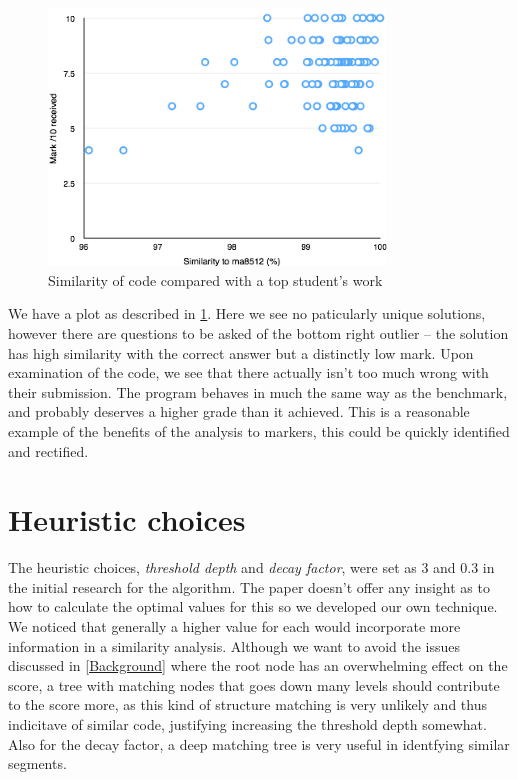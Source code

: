 \begin{figure}[h!]

	\centering
		\includegraphics[width=0.8\textwidth]{Figures/SimGraphma8512Loops}
	\caption{Similarity of code compared with a top student's work}
	\label{fig:TopMarkComparison}

\end{figure}

We have a plot as described in \cref{fig:TopMarkComparison}. Here we see no
paticularly unique solutions, however there are questions to be asked of the
bottom right outlier -- the solution has high similarity with the correct answer
but a distinctly low mark. Upon examination of the code, we see that there actually
isn't too much wrong with their submission. The program behaves in much the same
way as the benchmark, and probably deserves a higher grade than it achieved.
This is a reasonable example of the benefits of the analysis to markers, this
could be quickly identified and rectified.

\section{Heuristic choices}
The heuristic choices, \emph{threshold depth} and \emph{decay factor}, were 
set as 3 and 0.3 in the initial research for the algorithm\cite{ParseTreeKernel}. 
The paper doesn't offer any insight as to how to calculate the optimal values
for this so we developed our own technique. We noticed that generally a higher value
for each would incorporate more information in a similarity analysis. Although we
want to avoid the issues discussed in \cref{Background} where the root node has
an overwhelming effect on the score, a tree with matching nodes that goes down
many levels should contribute to the score more, as this kind of structure matching
is very unlikely and thus indicitave of similar code, justifying increasing the
threshold depth somewhat. Also for the decay factor, a deep matching tree is
very useful in identfying similar segments.


